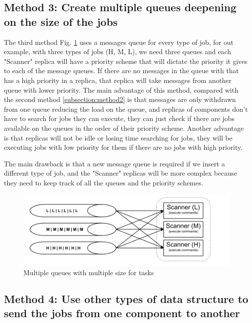 \subsection{Method 3: Create multiple queues deepening on the size of the jobs}

The third method Fig. \ref{fig:multipleQueueDistributionOfTasks} uses a messages queue for every type of job, for out example, with three types of jobs (H, M, L), we need three queues and each "Scanner" replica will have a priority scheme that will dictate the priority it gives to each of the message queues. If there are no messages in the queue with that has a high priority in a replica, that replica will take messages from another queue with lower priority. The main advantage of this method, compared with the second method \ref{subsection:method2} is that messages are only withdrawn from one queue reducing the load on the queue, and replicas of components don't have to search for jobs they can execute, they can just check if there are jobs available on the queues in the order of their priority scheme. Another advantage is that replicas will not be idle or losing time searching for jobs, they will be executing jobs with low priority for them if there are no jobs with high priority.

The main drawback is that a new message queue is required if we insert a different type of job, and the "Scanner" replicas will be more complex because they need to keep track of all the queues and the priority schemes.

\begin{figure}[ht]
\centering
\includegraphics[width=\linewidth]{./img/3_MultipleQueueLoadBalancing.png}
\caption{Multiple queues with multiple size for tasks}
\label{fig:multipleQueueDistributionOfTasks}
\end{figure}

\subsection{Method 4: Use other types of data structure to send the jobs from one component to another}


